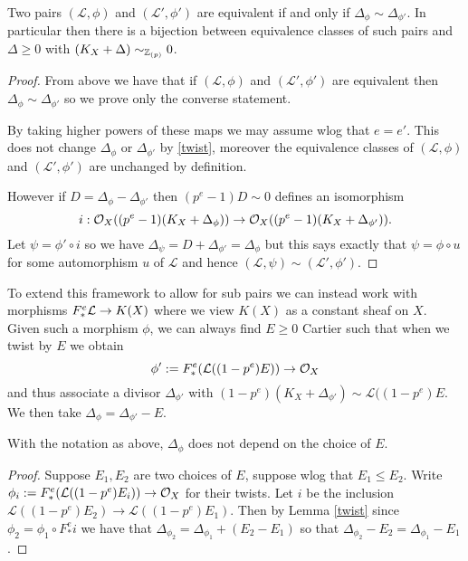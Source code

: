 \begin{lemma}
	
	Two pairs $(\mathcal{L}, \phi)$ and $(\mathcal{L}', \phi')$ are equivalent if and only if $\Delta_{\phi}\sim \Delta_{\phi'}$. In particular then there is a bijection between equivalence classes of such pairs and $\Delta \geq 0$ with $(K_{X}+\Delta)\sim_{\mathbb{Z}_{(p)}} 0$.
	
	
	\end{lemma}

\begin{proof}
	
	From above we have that if $(\mathcal{L}, \phi)$ and $(\mathcal{L}', \phi')$ are equivalent then $\Delta_{\phi}\sim \Delta_{\phi'}$ so we prove only the converse statement.
	
	By taking higher powers of these maps we may assume wlog that $e=e'$. This does not change $\Delta_{\phi}$ or $\Delta_{\phi'}$ by \autoref{twist}, moreover the equivalence classes of $(\mathcal{L}, \phi)$ and $(\mathcal{L}', \phi')$ are unchanged by definition.
	
	However if $D=\Delta_{\phi}-\Delta_{\phi'}$ then $(p^{e}-1)D \sim 0$ defines an isomorphism $$i:\mathcal{O}_{X}((p^{e}-1)(K_{X}+\Delta_{\phi}))\to \mathcal{O}_{X} ((p^{e}-1)(K_{X}+\Delta_{\phi'})).$$ Let $\psi=\phi' \circ i$ so we have $\Delta_{\psi}=D+\Delta_{\phi'}=\Delta_{\phi}$ but this says exactly that $\psi=\phi\circ u$ for some automorphism $u$ of $\mathcal{L}$ and hence $(\mathcal{L},\psi)\sim(\mathcal{L'},\phi')$. 
	
\end{proof}

To extend this framework to allow for sub pairs we can instead work with morphisms $F^{e}_{*}\mathcal{L} \to K(X)$ where we view $K(X)$ as a constant sheaf on $X$. Given such a morphism $\phi$, we can always find $E \geq 0$ Cartier such that when we twist by $E$ we obtain $$\phi':=F^{e}_{*}(\mathcal{L}((1-p^{e})E)) \to \mathcal{O}_{X}$$ and thus associate a divisor $\Delta_{\phi'}$ with $(1-p^{e})(K_{X}+\Delta_{\phi'})\sim \mathcal{L}((1-p^{e})E$. We then take $\Delta_{\phi}=\Delta_{\phi'}-E$.

\begin{lemma}
	With the notation as above, $\Delta_{\phi}$ does not depend on the choice of $E$.
\end{lemma}
\begin{proof}
	Suppose $E_{1},E_{2}$ are two choices of $E$, suppose wlog that $E_{1} \leq E_{2}$. Write $\phi_{i}:=F^{e}_{*}(\mathcal{L}((1-p^{e})E_{i})) \to \mathcal{O}_{X}$ for their twists. Let $i$ be the inclusion $\mathcal{L}((1-p^{e})E_{2}) \to\mathcal{L}((1-p^{e})E_{1})$. Then by Lemma \ref{twist} since $\phi_{2}=\phi_{1}\circ F_{*}^{e}i$ we have that $\Delta_{\phi_{2}}=\Delta_{\phi_{1}}+(E_{2}-E_{1})$ so that $\Delta_{\phi_{2}}-E_{2}=\Delta_{\phi_{1}}-E_{1}$.
\end{proof}


